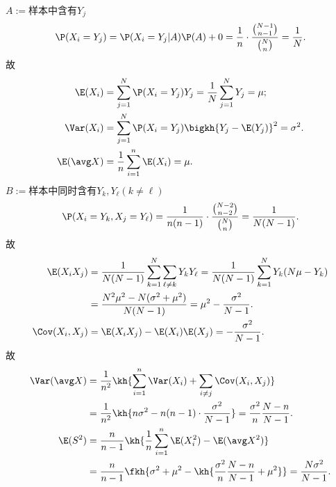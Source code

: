 $A:=$样本中含有$Y_j$
\[
	\P(X_i=Y_j)=\P(X_i=Y_j|A)\P(A)+0=\frac1n\cdot\frac{{N-1\choose n-1}}{{N\choose n}}=\frac1N.
\]
故
\begin{align*}
	\E(X_i)&=\sum_{j=1}^N\P(X_i=Y_j)Y_j=\frac1N\sum_{j=1}^NY_j=\mu;\\
	\Var(X_i)&=\sum_{j=1}^N\P(X_i=Y_j)\bigkh{Y_j-\E(Y_j)}^2=\sigma^2.\\
	\E(\avg X)&=\frac1n\sum_{i=1}^n\E(X_i)=\mu.
\end{align*}
$B:=$样本中同时含有$Y_k,Y_\ell(k\neq\ell)$
\[
	\P(X_i=Y_k,X_j=Y_\ell)=\frac1{n(n-1)}\cdot\frac{{N-2\choose n-2}}{{N\choose n}}=\frac1{N(N-1)}.
\]
故
\begin{align*}
	\E(X_iX_j)&=\frac1{N(N-1)}\sum_{k=1}^N\sum_{\ell\neq k}Y_kY_\ell=\frac1{N(N-1)}\sum_{k=1}^NY_k(N\mu-Y_k)\\
	&=\frac{N^2\mu^2-N(\sigma^2+\mu^2)}{N(N-1)}=\mu^2-\frac{\sigma^2}{N-1}.\\
	\Cov(X_i,X_j)&=\E(X_iX_j)-\E(X_i)\E(X_j)=-\frac{\sigma^2}{N-1}.
\end{align*}
故
\begin{align*}
	\Var(\avg X)&=\frac1{n^2}\kh{\sum_{i=1}^n\Var(X_i)+\sum_{i\neq j}\Cov(X_i,X_j)}\\
	&=\frac1{n^2}\kh{n\sigma^2-n(n-1)\cdot\frac{\sigma^2}{N-1}}=\frac{\sigma^2}n\frac{N-n}{N-1}.\\
	\E(S^2)&=\frac n{n-1}\kh{\frac1n\sum_{i=1}^n\E(X_i^2)-\E(\avg X^2)}\\
	&=\frac n{n-1}\fkh{\sigma^2+\mu^2-\kh{\frac{\sigma^2}n\frac{N-n}{N-1}+\mu^2}}=\frac{N\sigma^2}{N-1}.
\end{align*}
\fi